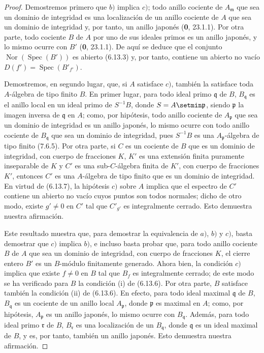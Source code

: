 \begin{proof}
Demostremos primero que $b)$ implica $c)$; todo anillo cociente de
$A_{\mathfrak m}$ que sea un dominio de integridad es una localización de
un anillo cociente de $A$ que sea un dominio de integridad y, por tanto,
un anillo japonés (\textbf 0, 23.1.1). Por otra parte, todo cociente $B$ de $A$ por
uno de sus ideales primos es un anillo japonés, y lo mismo ocurre con $B'$
(\textbf 0, 23.1.1). De aquí se deduce que el conjunto
$\operatorname{Nor}(\operatorname{Spec}(B'))$ es abierto (6.13.3) y, por
tanto, contiene un abierto no vacío
$D(f')=\operatorname{Spec}(B'_{f'})$.


Demostremos, en segundo lugar, que, si $A$ satisface $c)$, también la
satisface toda $A$-álgebra de tipo finito $B$. En primer lugar, para todo
ideal primo $\mathfrak q$ de $B$, $B_{\mathfrak q}$ es el anillo local en
un ideal primo de $S^{-1}B$, donde $S=A\setmin\mathfrak p$, siendo
$\mathfrak p$ la imagen inversa de $\mathfrak q$ en $A$; como, por
hipótesis, todo anillo cociente de $A_{\mathfrak p}$ que sea un dominio
de integridad es un anillo japonés, lo mismo ocurre con todo anillo
cociente de $B_{\mathfrak q}$ que sea un dominio de integridad, pues
$S^{-1}B$ es una $A_{\mathfrak p}$-álgebra de tipo finito (7.6.5).
Por otra parte, si $C$ es un cociente de $B$ que es un dominio de
integridad, con cuerpo de fracciones $K$, $K'$ es una extensión finita
puramente inseparable de $K$ y $C'$ es una sub-$C$-álgebra finita de
$K'$, con cuerpo de fracciones $K'$, entonces $C'$ es una $A$-álgebra de
tipo finito que es un dominio de integridad. En virtud de (6.13.7), la
hipótesis $c)$ sobre $A$ implica que el espectro de $C'$ contiene un
abierto no vacío cuyos puntos son todos normales; dicho de otro modo,
existe $g'\neq0$ en $C'$ tal que $C'_{g'}$ es integralmente cerrado.
Esto demuestra nuestra afirmación.

Este resultado muestra que, para demostrar la equivalencia de $a)$, $b)$
y $c)$, basta demostrar que $c)$ implica $b)$, e incluso basta probar que,
para todo anillo cociente $B$ de $A$ que sea un dominio de integridad,
con cuerpo de fracciones $K$, el cierre entero $B'$ es un $B$-módulo
finitamente generado. Ahora bien, la condición $c)$ implica que existe
$f\neq0$ en $B$ tal que $B_f$ es integralmente cerrado; de este modo se
ha verificado para $B$ la condición (i) de (6.13.6). Por otra parte, $B$
satisface también la condición (ii) de (6.13.6). En efecto, para todo
ideal maximal $\mathfrak q$ de $B$, $B_{\mathfrak q}$ es un cociente de
un anillo local $A_{\mathfrak p}$, donde $\mathfrak p$ es maximal en
$A$; como, por hipótesis, $A_{\mathfrak p}$ es un anillo japonés,
lo mismo ocurre con $B_{\mathfrak q}$. Además, para todo ideal primo
$\mathfrak r$ de $B$, $B_{\mathfrak r}$ es una localización de un
$B_{\mathfrak q}$, donde $\mathfrak q$ es un ideal maximal de $B$, y es,
por tanto, también un anillo japonés. Esto demuestra nuestra afirmación.


\end{proof}
